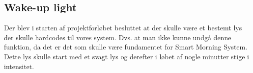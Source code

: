 \documentclass[11pt]{article}
\begin{document}
 \subsection*{Wake-up light}
 Der blev i starten af projektforløbet besluttet at der skulle være et bestemt lys der skulle hardcodes til vores system. Dvs. at man ikke kunne undgå denne funktion, da det er det som skulle være fundamentet for Smart Morning System. Dette lys skulle start med et svagt lys og derefter i løbet af nogle minutter stige i intensitet. 
\end{document}
